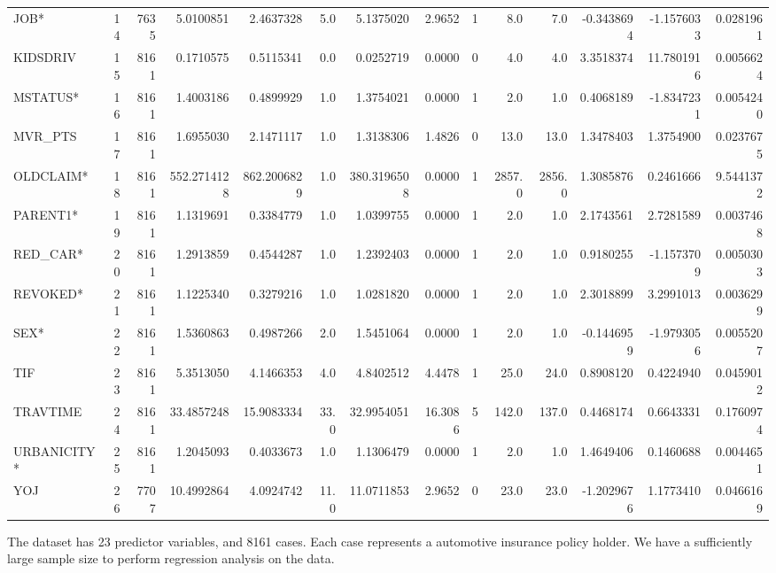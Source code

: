 \documentclass[]{article}
\begin{document}
\begin{table}[H]
{\begin{tabular}{lrrrrrrrrrrrrr}
JOB* & 14 & 7635 & 5.0100851 & 2.4637328 & 5.0 & 5.1375020 & 2.9652 & 1 & 8.0 & 7.0 & -0.3438694 & -1.1576033 & 0.0281961\\
KIDSDRIV & 15 & 8161 & 0.1710575 & 0.5115341 & 0.0 & 0.0252719 & 0.0000 & 0 & 4.0 & 4.0 & 3.3518374 & 11.7801916 & 0.0056624\\
\addlinespace
MSTATUS* & 16 & 8161 & 1.4003186 & 0.4899929 & 1.0 & 1.3754021 & 0.0000 & 1 & 2.0 & 1.0 & 0.4068189 & -1.8347231 & 0.0054240\\
MVR\_PTS & 17 & 8161 & 1.6955030 & 2.1471117 & 1.0 & 1.3138306 & 1.4826 & 0 & 13.0 & 13.0 & 1.3478403 & 1.3754900 & 0.0237675\\
OLDCLAIM* & 18 & 8161 & 552.2714128 & 862.2006829 & 1.0 & 380.3196508 & 0.0000 & 1 & 2857.0 & 2856.0 & 1.3085876 & 0.2461666 & 9.5441372\\
PARENT1* & 19 & 8161 & 1.1319691 & 0.3384779 & 1.0 & 1.0399755 & 0.0000 & 1 & 2.0 & 1.0 & 2.1743561 & 2.7281589 & 0.0037468\\
RED\_CAR* & 20 & 8161 & 1.2913859 & 0.4544287 & 1.0 & 1.2392403 & 0.0000 & 1 & 2.0 & 1.0 & 0.9180255 & -1.1573709 & 0.0050303\\
\addlinespace
REVOKED* & 21 & 8161 & 1.1225340 & 0.3279216 & 1.0 & 1.0281820 & 0.0000 & 1 & 2.0 & 1.0 & 2.3018899 & 3.2991013 & 0.0036299\\
SEX* & 22 & 8161 & 1.5360863 & 0.4987266 & 2.0 & 1.5451064 & 0.0000 & 1 & 2.0 & 1.0 & -0.1446959 & -1.9793056 & 0.0055207\\
TIF & 23 & 8161 & 5.3513050 & 4.1466353 & 4.0 & 4.8402512 & 4.4478 & 1 & 25.0 & 24.0 & 0.8908120 & 0.4224940 & 0.0459012\\
TRAVTIME & 24 & 8161 & 33.4857248 & 15.9083334 & 33.0 & 32.9954051 & 16.3086 & 5 & 142.0 & 137.0 & 0.4468174 & 0.6643331 & 0.1760974\\
URBANICITY* & 25 & 8161 & 1.2045093 & 0.4033673 & 1.0 & 1.1306479 & 0.0000 & 1 & 2.0 & 1.0 & 1.4649406 & 0.1460688 & 0.0044651\\
YOJ & 26 & 7707 & 10.4992864 & 4.0924742 & 11.0 & 11.0711853 & 2.9652 & 0 & 23.0 & 23.0 & -1.2029676 & 1.1773410 & 0.0466169\\
\bottomrule
\end{tabular}}
\end{table}

The dataset has 23 predictor variables, and 8161 cases. Each case
represents a automotive insurance policy holder. We have a sufficiently
large sample size to perform regression analysis on the data.
\end{document}
